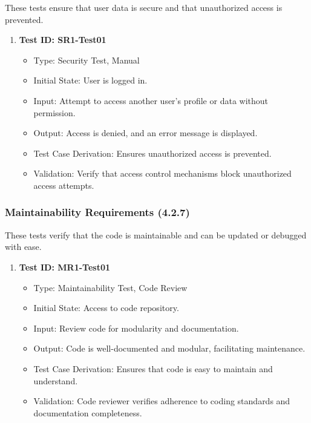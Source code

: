 \documentclass[12pt, titlepage]{article}
\begin{document}
These tests ensure that user data is secure and that unauthorized access is prevented.

\begin{enumerate}
    \item \textbf{Test ID: SR1-Test01}
        \begin{itemize}
            \item Type: Security Test, Manual
            \item Initial State: User is logged in.
            \item Input: Attempt to access another user’s profile or data without permission.
            \item Output: Access is denied, and an error message is displayed.
            \item Test Case Derivation: Ensures unauthorized access is prevented.
            \item Validation: Verify that access control mechanisms block unauthorized access attempts.
        \end{itemize}
\end{enumerate}

\subsubsection{Maintainability Requirements (4.2.7)}

These tests verify that the code is maintainable and can be updated or debugged with ease.

\begin{enumerate}
    \item \textbf{Test ID: MR1-Test01}
        \begin{itemize}
            \item Type: Maintainability Test, Code Review
            \item Initial State: Access to code repository.
            \item Input: Review code for modularity and documentation.
            \item Output: Code is well-documented and modular, facilitating maintenance.
            \item Test Case Derivation: Ensures that code is easy to maintain and understand.
            \item Validation: Code reviewer verifies adherence to coding standards and documentation completeness.
        \end{itemize}
\end{enumerate}
\end{document}
